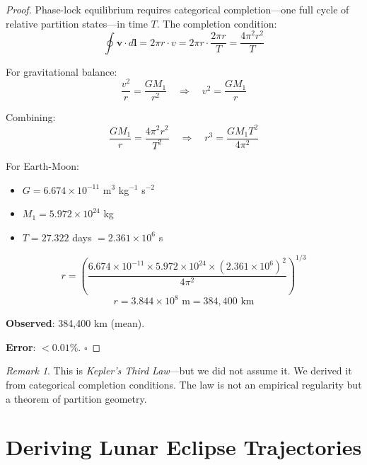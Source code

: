 \documentclass[twocolumn,10pt]{article}
\theoremstyle{definition}
\theoremstyle{remark}
\newtheorem{remark}[theorem]{Remark}
\begin{document}
\begin{proof}
Phase-lock equilibrium requires categorical completion---one full cycle of relative partition states---in time $T$. The completion condition:
\begin{equation}
\oint \mathbf{v} \cdot d\mathbf{l} = 2\pi r \cdot v = 2\pi r \cdot \frac{2\pi r}{T} = \frac{4\pi^2 r^2}{T}
\end{equation}

For gravitational balance:
\begin{equation}
\frac{v^2}{r} = \frac{GM_1}{r^2} \quad \Rightarrow \quad v^2 = \frac{GM_1}{r}
\end{equation}

Combining:
\begin{equation}
\frac{GM_1}{r} = \frac{4\pi^2 r^2}{T^2} \quad \Rightarrow \quad r^3 = \frac{GM_1 T^2}{4\pi^2}
\end{equation}

For Earth-Moon:
\begin{itemize}
    \item $G = 6.674 \times 10^{-11}$ m$^3$ kg$^{-1}$ s$^{-2}$
    \item $M_1 = 5.972 \times 10^{24}$ kg
    \item $T = 27.322$ days $= 2.361 \times 10^6$ s
\end{itemize}

\begin{equation}
r = \left(\frac{6.674 \times 10^{-11} \times 5.972 \times 10^{24} \times (2.361 \times 10^6)^2}{4\pi^2}\right)^{1/3}
\end{equation}
\begin{equation}
r = 3.844 \times 10^8 \text{ m} = 384{,}400 \text{ km}
\end{equation}

\textbf{Observed}: 384,400 km (mean).

\textbf{Error}: $< 0.01\%$. $\square$
\end{proof}

\begin{remark}
This is \emph{Kepler's Third Law}---but we did not assume it. We derived it from categorical completion conditions. The law is not an empirical regularity but a theorem of partition geometry.
\end{remark}

\section{Deriving Lunar Eclipse Trajectories}
\label{sec:eclipses}
\end{document}
